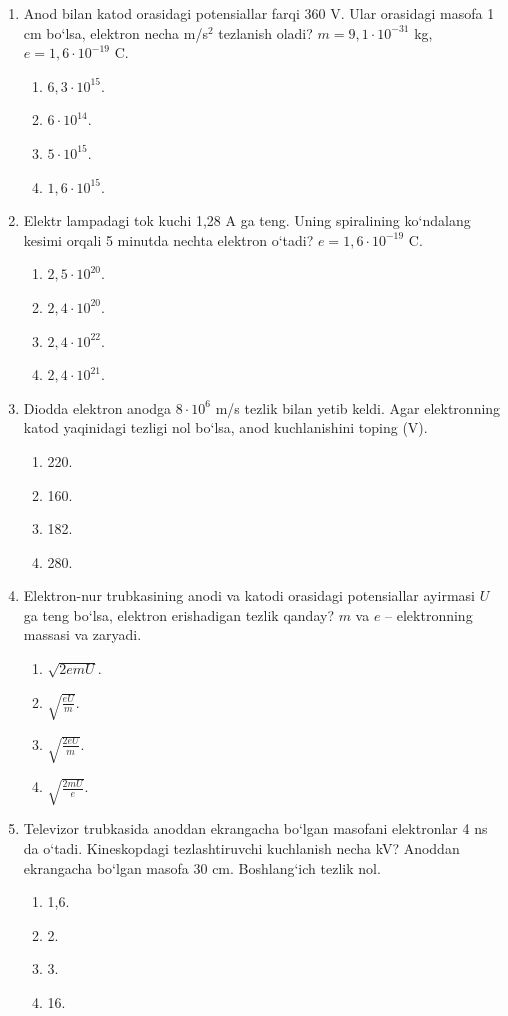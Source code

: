 \begin{enumerate}
\item Anod bilan katod orasidagi potensiallar farqi 360 V. Ular orasidagi masofa 1 cm bo‘lsa, elektron necha m/s$^2$ tezlanish oladi? $m=9,1 \cdot 10^{-31}$ kg, $e=1,6 \cdot 10^{-19}$ C.
\begin{enumerate}[label=\Alph*)]
\item $6,3 \cdot 10^{15}$.
\item $6 \cdot 10^{14}$.
\item $5 \cdot 10^{15}$.
\item $1,6 \cdot 10^{15}$.
\end{enumerate}


\item Elektr lampadagi tok kuchi 1,28 A ga teng. Uning spiralining ko‘ndalang kesimi orqali 5 minutda nechta elektron o‘tadi? $e=1,6 \cdot 10^{-19}$ C.
\begin{enumerate}[label=\Alph*)]
\item $2,5 \cdot 10^{20}$.
\item $2,4 \cdot 10^{20}$.
\item $2,4 \cdot 10^{22}$.
\item $2,4 \cdot 10^{21}$.
\end{enumerate}

\item Diodda elektron anodga $8 \cdot 10^6$ m/s tezlik bilan yetib keldi. Agar elektronning katod yaqinidagi tezligi nol bo‘lsa, anod kuchlanishini toping (V).
\begin{enumerate}[label=\Alph*)]
\item 220.
\item 160.
\item 182.
\item 280.
\end{enumerate}

\item Elektron-nur trubkasining anodi va katodi orasidagi potensiallar ayirmasi $U$ ga teng bo‘lsa, elektron erishadigan tezlik qanday? $m$ va $e$ – elektronning massasi va zaryadi.
\begin{enumerate}[label=\Alph*)]
\item $\sqrt{2emU}$.
\item $\sqrt{\frac{eU}{m}}$.
\item $\sqrt{\frac{2eU}{m}}$.
\item $\sqrt{\frac{2mU}{e}}$.
\end{enumerate}

\item Televizor trubkasida anoddan ekrangacha bo‘lgan masofani elektronlar 4 ns da o‘tadi. Kineskopdagi tezlashtiruvchi kuchlanish necha kV? Anoddan ekrangacha bo‘lgan masofa 30 cm. Boshlang‘ich tezlik nol.
\begin{enumerate}[label=\Alph*)]
\item 1,6.
\item 2.
\item 3.
\item 16.
\end{enumerate}

\end{enumerate}


